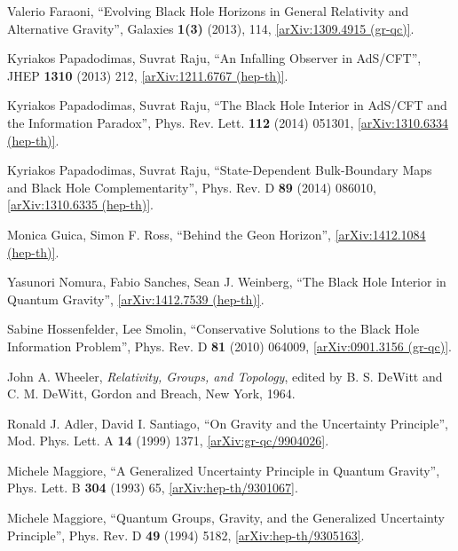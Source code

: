 \documentclass[12pt]{article}
\newcommand{\2}{$^2$}
\newcommand{\3}{$^3$}
\newcommand{\4}{$_4$}
\newcommand{\5}{$_5$}
\begin{document}
\begin{thebibliography}{400}
Valerio Faraoni, ``Evolving Black Hole Horizons in General Relativity and Alternative Gravity'', Galaxies \textbf{1(3)} (2013), 114, \href{http://arxiv.org/abs/1309.4915}{[arXiv:1309.4915 (gr-qc)]}.

Kyriakos Papadodimas, Suvrat Raju, ``An Infalling Observer in AdS/CFT'', JHEP \textbf{1310} (2013) 212,
\href{http://arxiv.org/abs/1211.6767}{[arXiv:1211.6767 (hep-th)]}.

Kyriakos Papadodimas, Suvrat Raju, ``The Black Hole Interior in AdS/CFT and the Information Paradox'', Phys. Rev. Lett. \textbf{112} (2014) 051301, \href{http://arxiv.org/abs/1310.6334}{[arXiv:1310.6334 (hep-th)]}.

Kyriakos Papadodimas, Suvrat Raju, ``State-Dependent Bulk-Boundary Maps and Black Hole Complementarity'', Phys. Rev. D \textbf{89} (2014) 086010, \href{http://arxiv.org/abs/1310.6335}{[arXiv:1310.6335 (hep-th)]}.

Monica Guica, Simon F. Ross, ``Behind the Geon Horizon'', \href{http://arxiv.org/abs/1412.1084}{[arXiv:1412.1084 (hep-th)]}.

Yasunori Nomura, Fabio Sanches, Sean J. Weinberg, ``The Black Hole Interior in Quantum Gravity'', \href{http://arxiv.org/abs/1412.7539}{[arXiv:1412.7539 (hep-th)]}.


 Sabine Hossenfelder, Lee Smolin, ``Conservative Solutions to the Black Hole Information Problem'', Phys. Rev. D \textbf{81} (2010) 064009, \href{http://arxiv.org/abs/0901.3156}{[arXiv:0901.3156 (gr-qc)]}. 




John A. Wheeler, \emph{Relativity, Groups, and Topology}, edited by B. S. DeWitt and C. M. DeWitt, Gordon and Breach, New York, 1964.





 Ronald J. Adler, David I. Santiago, ``On Gravity and the Uncertainty Principle'', Mod. Phys. Lett. A \textbf{14} (1999) 1371, \href{http://arxiv.org/abs/gr-qc/9904026}{	[arXiv:gr-qc/9904026]}. 

 Michele Maggiore, ``A Generalized Uncertainty Principle in Quantum Gravity'', Phys. Lett. B \textbf{304} (1993) 65, \href{http://arxiv.org/abs/hep-th/9301067}{[arXiv:hep-th/9301067]}.

 Michele Maggiore, ``Quantum Groups, Gravity, and the Generalized Uncertainty Principle'', Phys. Rev. D \textbf{49} (1994) 5182, \href{http://arxiv.org/abs/hep-th/9305163}{[arXiv:hep-th/9305163]}. 


\end{thebibliography}
\end{document}
